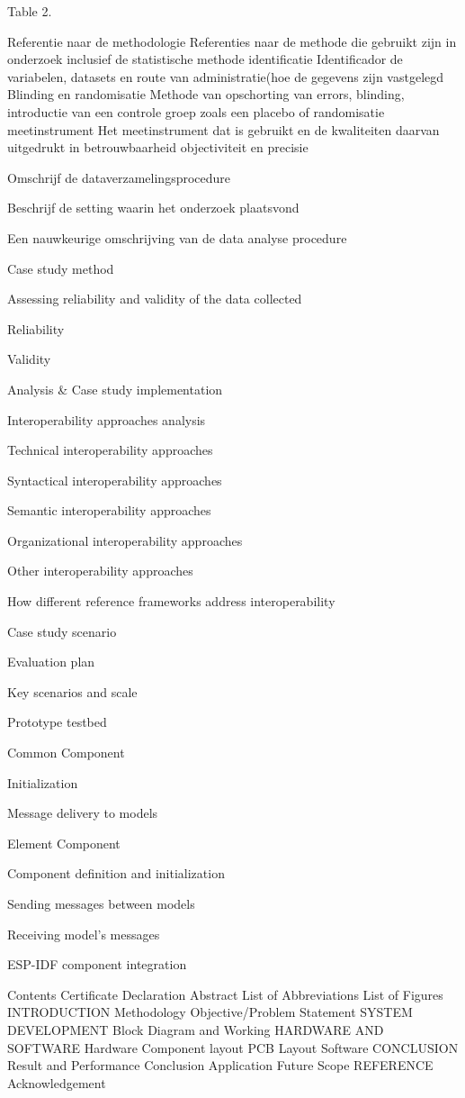 Table 2. 



Referentie naar de methodologie
Referenties naar de methode die gebruikt zijn in onderzoek inclusief de statistische methode
identificatie
Identificador de variabelen, datasets en route van administratie(hoe de gegevens zijn vastgelegd
Blinding en randomisatie
Methode van opschorting van errors, blinding, introductie van een controle groep zoals een placebo of randomisatie
meetinstrument
Het meetinstrument dat is gebruikt en de kwaliteiten daarvan uitgedrukt in betrouwbaarheid objectiviteit en precisie

Omschrijf de dataverzamelingsprocedure

Beschrijf de setting waarin het onderzoek plaatsvond


Een nauwkeurige omschrijving van de data analyse procedure


Case study method



Assessing reliability and validity of the data collected

Reliability

Validity

Analysis & Case study implementation

Interoperability approaches analysis

Technical interoperability approaches

Syntactical interoperability approaches

Semantic interoperability approaches

Organizational interoperability approaches

Other interoperability approaches

How different reference frameworks address interoperability

Case study scenario

Evaluation plan

Key scenarios and scale

Prototype testbed

Common Component

Initialization

Message delivery to models 

Element Component 

Component definition and initialization

Sending messages between models 

Receiving model’s messages

ESP-IDF component integration


Contents
Certificate 
Declaration  
Abstract  
List of Abbreviations  
List of Figures 
INTRODUCTION  
Methodology 
Objective/Problem Statement  
SYSTEM DEVELOPMENT 
Block Diagram and Working  
HARDWARE AND SOFTWARE 
Hardware 
Component layout  
PCB Layout  
Software  
CONCLUSION  
Result and Performance  
Conclusion  
Application 
Future Scope  
REFERENCE  
Acknowledgement  